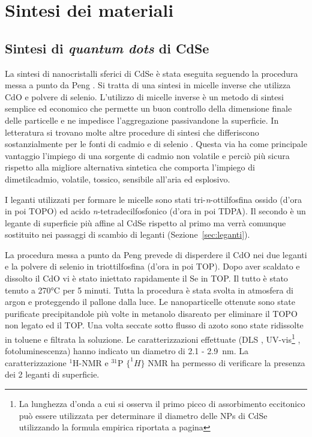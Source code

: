 \chapter{Sintesi dei materiali}

\section{Sintesi di \emph{quantum dots} di CdSe}
La sintesi di nanocristalli sferici di CdSe è stata eseguita seguendo la procedura messa a punto da Peng \cite{qd-CdSe-CdO}.
Si tratta di una sintesi in micelle inverse
che utilizza CdO e polvere di selenio. L'utilizzo di micelle inverse è un metodo di sintesi semplice ed economico che permette un buon controllo della dimensione finale delle particelle e ne impedisce l'aggregazione passivandone la superficie. In letteratura si trovano molte altre procedure di sintesi che differiscono sostanzialmente per le fonti di cadmio e di selenio \cite{qd-CdSe-Cd,qd-CdSe-CdCl2}. Questa via ha come principale vantaggio l'impiego di una sorgente di cadmio non volatile e perciò più sicura rispetto alla migliore alternativa sintetica che comporta l'impiego di dimetilcadmio, volatile, tossico, sensibile all'aria ed esplosivo.

I leganti utilizzati per formare le micelle sono stati tri-{\itshape n}-ottilfosfina ossido (d'ora in poi TOPO) ed acido {\itshape n}-tetradecilfosfonico (d'ora in poi TDPA). Il secondo è un legante di superficie più affine al CdSe rispetto al primo \cite{lig-CdSe-P} ma verrà comunque sostituito nei passaggi di scambio di leganti (Sezione~\ref{sec:leganti}). 

La procedura messa a punto da Peng \cite{qd-CdSe-CdO} prevede di disperdere il CdO nei due leganti e la polvere di selenio in triottilfosfina (d'ora in poi TOP). Dopo aver scaldato e dissolto il CdO vi è stato iniettato rapidamente il Se in TOP\@. Il tutto è stato tenuto a 270°C per 5 minuti. Tutta la procedura è stata svolta in atmosfera di argon e proteggendo il pallone dalla luce. Le nanoparticelle ottenute sono state purificate precipitandole più volte in metanolo disareato per eliminare il TOPO non legato ed il TOP\@. Una volta seccate sotto flusso di azoto sono state ridissolte in toluene e filtrata la soluzione. Le caratterizzazioni effettuate (DLS
, UV-vis\footnote{La lunghezza d'onda a cui si osserva il primo picco di assorbimento eccitonico può essere utilizzata per determinare il diametro delle NPs di CdSe utilizzando la formula empirica riportata a pagina \pageref{eq:diametro}}
, fotoluminescenza) hanno indicato un diametro di 2.1 - 2.9~nm. La caratterizzazione $^1$H-NMR e $^{31}$P $\{^1H\}$ NMR ha permesso di verificare la presenza dei 2 leganti di superficie.

